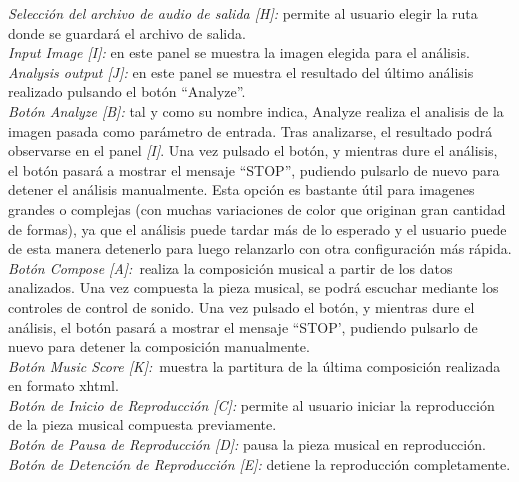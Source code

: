		\noindent\textit{Selección del archivo de audio de salida [H]:} permite al usuario elegir la ruta donde se guardará el archivo de salida.\\
		
		\noindent\textit{Input Image [I]:} en este panel se muestra la imagen elegida para el análisis.\\
		
		\noindent\textit{Analysis output [J]:} en este panel se muestra el resultado del último análisis realizado pulsando el botón ``Analyze''.\\
		
		\noindent\textit{Botón Analyze [B]:} tal y como su nombre indica, Analyze realiza el analisis de la imagen pasada como parámetro de entrada. Tras analizarse, el resultado podrá observarse en el panel \textit{[I]}. Una vez pulsado el botón, y mientras dure el análisis, el botón pasará a mostrar el mensaje ``STOP'', pudiendo pulsarlo de nuevo para detener el análisis manualmente. Esta opción es bastante útil para imagenes grandes o complejas (con muchas variaciones de color que originan gran cantidad de formas), ya que el análisis puede tardar más de lo esperado y el usuario puede de esta manera detenerlo para luego relanzarlo con otra configuración más rápida.\\
		
		\noindent\textit{Botón Compose [A]:}\ realiza la composición musical a partir de los datos analizados. Una vez compuesta la pieza musical, se podrá escuchar mediante los controles de control de sonido. Una vez pulsado el botón, y mientras dure el análisis, el botón pasará a mostrar el mensaje ``STOP', pudiendo pulsarlo de nuevo para detener la composición manualmente.\\
		
		\noindent\textit{Botón Music Score [K]:}\ muestra la partitura de la última composición realizada en formato xhtml.\\
		
		\noindent\textit{Botón de Inicio de Reproducción [C]:} permite al usuario iniciar la reproducción de la pieza musical compuesta previamente.\\
		
		\noindent\textit{Botón de Pausa de Reproducción [D]:} pausa la pieza musical en reproducción.\\
		
		\noindent\textit{Botón de Detención de Reproducción [E]:} detiene la reproducción completamente.\\
		
